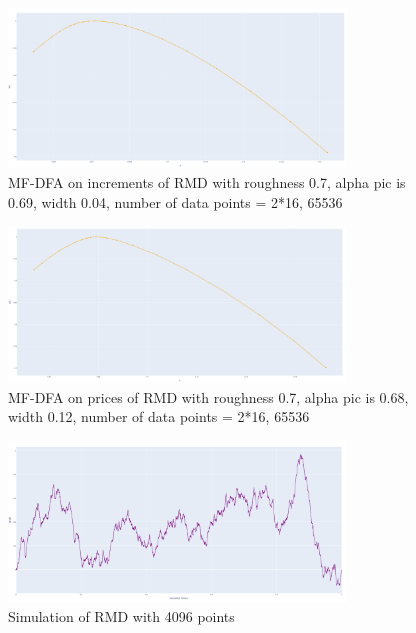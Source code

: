 \begin{figure}[!ht]
    \centering
    \includegraphics[width=0.8\textwidth]{img/rmd_2_16}
    \caption{MF-DFA on increments of RMD with roughness 0.7, alpha pic is 0.69, width 0.04, number of data points = 2*16, 65536}
    \label{fig:rmd_2_16}
\end{figure}

\begin{figure}[!ht]
    \centering
    \includegraphics[width=0.8\textwidth]{img/rmd_2_16_on_prices}
    \caption{MF-DFA on prices of RMD with roughness 0.7, alpha pic is 0.68, width 0.12, number of data points = 2*16, 65536}
    \label{fig:rmd_2_16_on_prices}
\end{figure}

\begin{figure}[!ht]
    \centering
    \includegraphics[width=0.8\textwidth]{img/simulation_rmd}
    \caption{Simulation of RMD with 4096 points}
    \label{fig:simulation_rmd}
\end{figure}